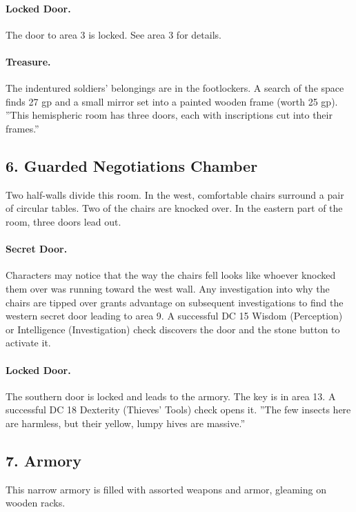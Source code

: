 \documentclass[10pt,a4paper,twoside,twocolumn,openany,bg=print,nodeprecatedcode]{dndbook}
\begin{document}
\paragraph{Locked Door.}
The door to area 3 is locked. See area 3 for details.
\paragraph{Treasure.}
The indentured soldiers' belongings are in the footlockers. A search of the space finds 27 gp and a small mirror set into a painted wooden frame (worth 25 gp).
\DndQuote%
{}
{''This hemispheric room has three doors, each with inscriptions cut into their frames.''}
{}
\subsection{6. Guarded Negotiations Chamber}
\begin{DndReadAloud}{}
Two half-walls divide this room. In the west, comfortable chairs surround a pair of circular tables. Two of the chairs are knocked over. In the eastern part of the room, three doors lead out.
\end{DndReadAloud}

\paragraph{Secret Door.}
Characters may notice that the way the chairs fell looks like whoever knocked them over was running toward the west wall. Any investigation into why the chairs are tipped over grants advantage on subsequent investigations to find the western secret door leading to area 9. A successful DC 15 Wisdom (Perception) or Intelligence (Investigation) check discovers the door and the stone button to activate it.
\paragraph{Locked Door.}
The southern door is locked and leads to the armory. The key is in area 13. A successful DC 18 Dexterity (Thieves' Tools) check opens it.
\DndQuote%
{}
{''The few insects here are harmless, but their yellow, lumpy hives are massive.''}
{}
\subsection{7. Armory}
\begin{DndReadAloud}{}
This narrow armory is filled with assorted weapons and armor, gleaming on wooden racks.
\end{DndReadAloud}
\end{document}
